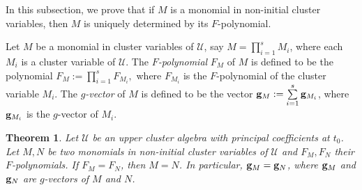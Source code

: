 \documentclass{amsart}
\newtheorem{theorem}{Theorem}[section]
\theoremstyle{definition}
\theoremstyle{remark}
\numberwithin{equation}{section}
\begin{document}
In this subsection, we prove that if $M$ is a monomial in non-initial cluster variables, then $M$ is uniquely determined by its $F$-polynomial.

Let $M$ be a monomial in cluster variables of $\mathcal U$, say $M=\prod\limits_{i=1}^sM_i$, where each $M_i$ is a cluster variable of $\mathcal U$. The  {\em $F$-polynomial} $F_M$ of $M$ is defined to be the polynomial
$F_M:=\prod\limits_{i=1}^sF_{M_i},$
where $F_{M_i}$ is the $F$-polynomial of the cluster variable $M_i$.
The {\em $g$-vector}  of $M$ is defined to be the vector ${\bf g}_M:=\sum\limits_{i=1}^s{\bf g}_{M_i}$, where ${\bf g}_{M_i}$ is the $g$-vector of $M_i$.



\begin{theorem}\label{thmfpoly}
 Let $\mathcal U$ be an upper cluster algebra with principal coefficients at $t_0$. Let $M, N$ be two  monomials in non-initial cluster variables of $\mathcal U$ and $F_M, F_N$ their $F$-polynomials.   If $F_M=F_N$,  then $M=N$. In particular, ${\bf g}_M={\bf g}_N$, where ${\bf g}_M$ and ${\bf g}_N$ are $g$-vectors of $M$ and $N$.
\end{theorem}
\end{document}
